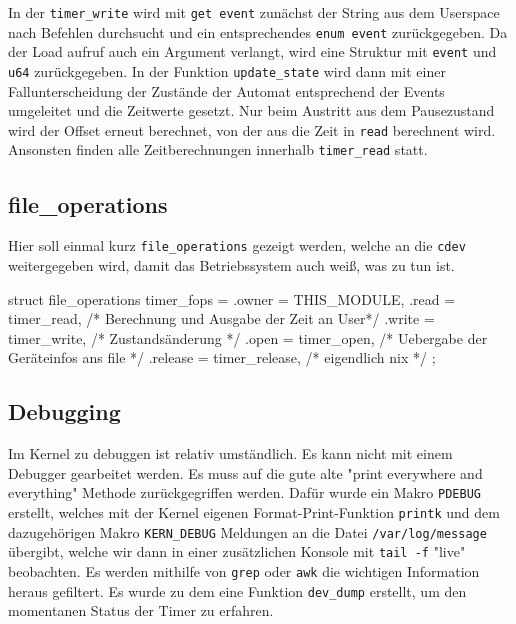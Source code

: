 \documentclass[
   draft=false
  ,paper=a4
  ,twoside=false
  ,fontsize=11pt
  ,headsepline
  ,BCOR10mm
  ,DIV11
  ,parskip=full+
]{scrartcl} %
\begin{document}
In der \texttt{timer\_write} wird mit \texttt{get event} zunächst der String
aus dem Userspace nach Befehlen durchsucht und ein entsprechendes
\texttt{enum event} zurückgegeben. Da der Load aufruf auch ein Argument
verlangt, wird eine Struktur mit \texttt{event} und \texttt{u64} zurückgegeben.
In der Funktion \texttt{update\_state} wird dann mit einer Fallunterscheidung
der Zustände der Automat entsprechend der Events umgeleitet und die
Zeitwerte gesetzt.
Nur beim Austritt aus dem Pausezustand wird der Offset erneut berechnet, von
der aus die Zeit in \texttt{read} berechnent wird. Ansonsten finden
alle Zeitberechnungen innerhalb \texttt{timer\_read} statt.


\subsection{file\_operations}
Hier soll einmal kurz \texttt{file\_operations} gezeigt werden, welche an
die \texttt{cdev} weitergegeben wird, damit das Betriebssystem auch weiß,
was zu tun ist.
\begin{ccode}
struct file_operations timer_fops = {
    .owner   = THIS_MODULE,
    .read    = timer_read,   /* Berechnung und Ausgabe der Zeit an User*/
    .write   = timer_write,  /* Zustandsänderung */
    .open    = timer_open,   /* Uebergabe der Geräteinfos ans file */
    .release = timer_release, /* eigendlich nix */
};
\end{ccode}


\subsection{Debugging}
Im Kernel zu debuggen ist relativ umständlich. Es kann nicht mit einem
Debugger gearbeitet werden. Es muss auf die gute alte "{}print everywhere and
everything"{} Methode zurückgegriffen werden. Dafür wurde ein Makro
\texttt{PDEBUG} erstellt, welches mit der Kernel eigenen Format-Print-Funktion
\texttt{printk} und dem dazugehörigen Makro \texttt{KERN\_DEBUG} Meldungen an
die Datei \texttt{/var/log/message} übergibt, welche wir dann in einer zusätzlichen
Konsole mit \texttt{tail -f} "{}live"{} beobachten. Es werden mithilfe von
\texttt{grep} oder \texttt{awk} die wichtigen Information heraus gefiltert.
Es wurde zu dem eine
Funktion \texttt{dev\_dump} erstellt, um den momentanen Status der Timer zu
erfahren.
\end{document}
